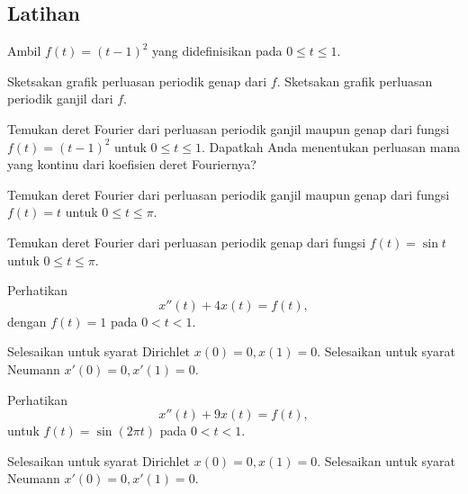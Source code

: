 \subsection{Latihan}

\begin{exercise}
Ambil $f(t) = {(t-1)}^2$ yang didefinisikan pada $0 \leq t \leq 1$.
\begin{tasks}
\task Sketsakan grafik perluasan periodik genap dari $f$.
\task Sketsakan grafik perluasan periodik ganjil dari $f$.
\end{tasks}
\end{exercise}

\begin{exercise}
Temukan deret Fourier dari perluasan periodik ganjil maupun genap dari 
fungsi $f(t) = {(t-1)}^2$ untuk $0 \leq t \leq 1$.
Dapatkah Anda menentukan perluasan mana yang kontinu dari koefisien
deret Fouriernya?
\end{exercise}

\begin{exercise}
Temukan deret Fourier dari perluasan periodik ganjil maupun genap dari 
fungsi $f(t) = t$ untuk $0 \leq t \leq \pi$.
\end{exercise}

\begin{exercise}
Temukan deret Fourier dari perluasan periodik genap dari 
fungsi $f(t) = \sin t$ untuk $0 \leq t \leq \pi$.
\end{exercise}

\begin{exercise}
\pagebreak[2]
Perhatikan
\begin{equation*}
x''(t) + 4 x(t) = f(t) ,
\end{equation*}
dengan $f(t) = 1$ pada $0 < t < 1$.
\begin{tasks}
\task Selesaikan untuk syarat Dirichlet $x(0)=0, x(1) = 0$.
\task Selesaikan untuk syarat Neumann $x'(0)=0, x'(1) = 0$.
\end{tasks}
\end{exercise}

\begin{exercise}
Perhatikan
\begin{equation*}
x''(t) + 9 x(t) = f(t) ,
\end{equation*}
untuk $f(t) = \sin (2\pi t)$ pada $0 < t < 1$.
\begin{tasks}
\task Selesaikan untuk syarat Dirichlet $x(0)=0, x(1) = 0$.
\task Selesaikan untuk syarat Neumann $x'(0)=0, x'(1) = 0$.
\end{tasks}
\end{exercise}

